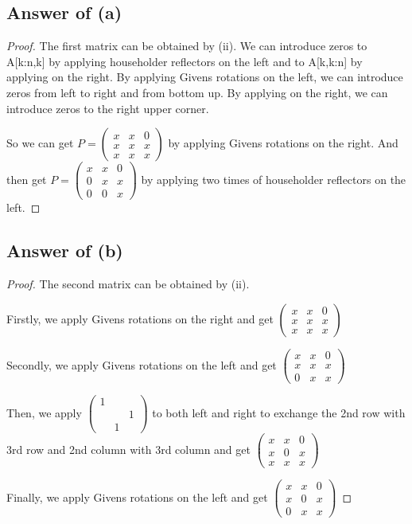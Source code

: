 \documentclass[letterpaper,11pt\iffalse ,draft\fi]{article}
\begin{document}
\subsection*{Answer of (a)}
\begin{proof}
The first matrix can be obtained by (ii). We can introduce zeros to A[k:n,k] by applying householder reflectors on the left and to A[k,k:n] by applying on the right. By applying Givens rotations on the left, we can introduce zeros from left to right and from bottom up. By applying on the right, we can introduce zeros to the right upper corner.

So we can get $P=\begin{pmatrix}
x & x & 0 \\ x & x & x \\ x & x & x
\end{pmatrix}$ by applying Givens rotations on the right. And then get $P=\begin{pmatrix}
x & x & 0 \\ 0 & x & x \\ 0 & 0 & x
\end{pmatrix}$ by applying two times of householder reflectors on the left.
\end{proof}


\subsection*{Answer of (b)}
\begin{proof}
The second matrix can be obtained by (ii). 

Firstly, we apply Givens rotations on the right and get $\begin{pmatrix}
x & x & 0 \\ x & x & x \\ x & x & x
\end{pmatrix}$

Secondly, we apply Givens rotations on the left and get $\begin{pmatrix}
x & x & 0 \\ x & x & x \\ 0 & x & x
\end{pmatrix}$

Then, we apply $\begin{pmatrix}
1 \\  &  & 1 \\  & 1 & 
\end{pmatrix}$ to both left and right to exchange the 2nd row with 3rd row and 2nd column with 3rd column and get
$\begin{pmatrix}
x & x & 0 \\ x & 0 & x \\ x & x & x
\end{pmatrix}$

Finally,  we apply Givens rotations on the left and get $\begin{pmatrix}
x & x & 0 \\ x & 0 & x \\ 0 & x & x
\end{pmatrix}$
\end{proof}
\end{document}
